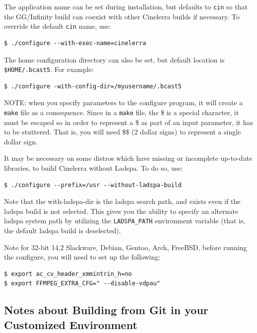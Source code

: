 The application name can be set during installation, but defaults to \texttt{cin} so that the GG/Infinity build can coexist with other Cinelerra builds if necessary.  To override the default \texttt{cin} name, use:	
\begin{lstlisting}[numbers=none]
$ ./configure --with-exec-name=cinelerra
\end{lstlisting}

The home configuration directory can also be set, but default location is \texttt{\$HOME/.bcast5}.  
For example:

\begin{lstlisting}[numbers=none]
$ ./configure -with-config-dir=/myusername/.bcast5
\end{lstlisting}

NOTE:  when you specify parameters to the configure program, it will create a \texttt{make} file as a consequence.  
Since in a \texttt{make} file, the \$ is a special character, it must be escaped so in order to represent a \$ as part of an input parameter, it has to be stuttered.  
That is, you will need \$\$ (2 dollar signs) to represent a single dollar sign. 

It may be necessary on some distros which have missing or incomplete up-to-date libraries, to build Cinelerra without Ladspa.  
To do so, use:

\begin{lstlisting}[numbers=none]
$ ./configure --prefix=/usr --without-ladspa-build
\end{lstlisting}

Note that the with-ladspa-dir is the ladspa search path, and exists even if the ladspa build is not selected.  This gives you the ability to specify an alternate ladspa system path by utilizing the \texttt{LADSPA\_PATH} environment variable (that is, the default ladspa build is deselected).

Note for 32-bit 14.2 Slackware, Debian, Gentoo, Arch, FreeBSD, before running the configure, you will need to set up the following:

\begin{lstlisting}[numbers=none]
$ export ac_cv_header_xmmintrin_h=no
$ export FFMPEG_EXTRA_CFG=" --disable-vdpau"
\end{lstlisting}

\subsection{Notes about Building from Git in your Customized Environment}%
\label{sub:notes_about_building_from_git_in_your_customized_environment}

